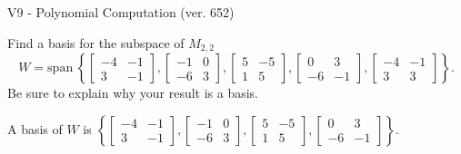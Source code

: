 \begin{exercise}
  \begin{exerciseTitle}V9 - Polynomial Computation (ver. 652)\end{exerciseTitle}
  \begin{exerciseStatement}
    Find a basis for the subspace of \(M_{2,2}\) 
\[W=\mathrm{span}\ \left\{\left[\begin{array}{cc}
-4 & -1 \\
3 & -1
\end{array}\right] , \left[\begin{array}{cc}
-1 & 0 \\
-6 & 3
\end{array}\right] , \left[\begin{array}{cc}
5 & -5 \\
1 & 5
\end{array}\right] , \left[\begin{array}{cc}
0 & 3 \\
-6 & -1
\end{array}\right] , \left[\begin{array}{cc}
-4 & -1 \\
3 & 3
\end{array}\right]\right\}.\]
 Be sure to explain why your result is a basis.


  \end{exerciseStatement}
  \begin{exerciseAnswer}
   A basis of \(W\) is  \(\left\{\left[\begin{array}{cc}
-4 & -1 \\
3 & -1
\end{array}\right] , \left[\begin{array}{cc}
-1 & 0 \\
-6 & 3
\end{array}\right] , \left[\begin{array}{cc}
5 & -5 \\
1 & 5
\end{array}\right] , \left[\begin{array}{cc}
0 & 3 \\
-6 & -1
\end{array}\right]\right\}\).
  


  \end{exerciseAnswer}
\end{exercise}